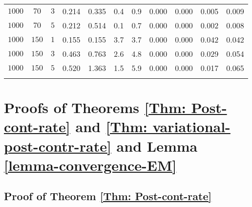 \documentclass[pdftex, noinfoline, letter]{imsart}
\theoremstyle{plain}
\begin{document}
\begin{table}[!]
\begin{adjustwidth}{-.5in}{-.5in}
{\begin{tabular}{ccc|cc|cc|cc|cc}
    $1000$ & $70$ & $3$ &
    0.214 & 0.335  &
    0.4 &  0.9  &
    0.000 & 0.000 & 0.005 & 0.009\\
    $1000$ & $70$ & $5$ &
    0.212 & 0.514 &
    0.1 &  0.7
    &0.000 & 0.000 & 0.002 & 0.008\\   
    \hline
    $1000$ & $150$ & $1$  &
    0.155 & 0.155 &
    3.7 &  3.7
    & 0.000  & 0.000 & 0.042 & 0.042\\
    $1000$ & $150$ & $3$ &
    0.463 & 0.763 &
    2.6 &  4.8
    & 0.000 & 0.000 & 0.029 & 0.054\\
    $1000$ & $150$ & $5$ &
    0.520 & 1.363 &
    1.5 &  5.9 &
    0.000 & 0.000 & 0.017 & 0.065\\   
\Xhline{2\arrayrulewidth}    
\end{tabular}  
}
\end{adjustwidth}
\end{table}
\FloatBarrier



\section{Proofs of Theorems \ref{Thm: Post-cont-rate} and \ref{Thm: variational-post-contr-rate} and Lemma \ref{lemma-convergence-EM}}
\label{sec:proofs}

\subsection{Proof of Theorem \ref{Thm: Post-cont-rate}}
\end{document}
